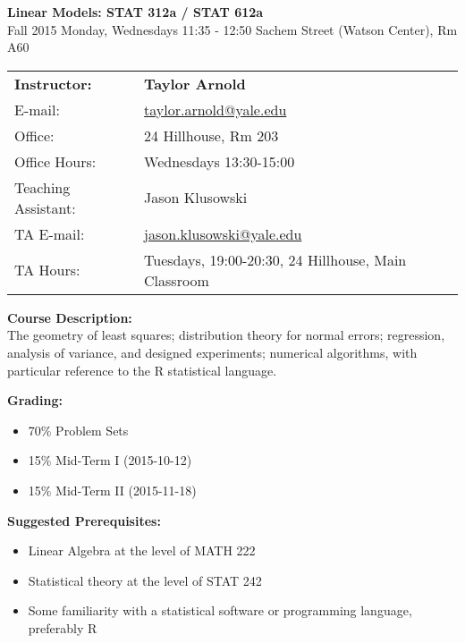 \documentclass[12pt]{article}
\begin{document}
\begin{center}
{\bf Linear Models: STAT 312a / STAT 612a} \\
Fall 2015 \quad Monday, Wednesdays 11:35 - 12:50  Sachem Street (Watson Center), Rm A60
\end{center}

\bigskip

\noindent
\begin{tabular}{ l l }
{\bf Instructor:} &  {\bf Taylor Arnold} \\
E-mail: & \href{mailto:taylor.arnold@yale.edu}{taylor.arnold@yale.edu} \\
Office: & 24 Hillhouse, Rm 203 \\
Office Hours: & Wednesdays 13:30-15:00 \\
Teaching Assistant: & Jason Klusowski \\
TA E-mail: & \href{mailto:jason.klusowski@yale.edu}{jason.klusowski@yale.edu} \\
TA Hours: & Tuesdays, 19:00-20:30, 24 Hillhouse, Main Classroom
\end{tabular}

\vspace{1cm}

{\bf Course Description:} \\
The geometry of least squares; distribution theory for normal errors; regression, analysis of variance, and designed experiments; numerical algorithms, with particular reference to the R statistical language.

\vspace{0.5cm}

{\bf Grading:}
\begin{itemize}\setlength\itemsep{0em}
\item 70\% Problem Sets
\item 15\% Mid-Term I (2015-10-12)
\item 15\% Mid-Term II (2015-11-18)
\end{itemize}

\vspace{0.5cm}

{\bf Suggested Prerequisites:}
\begin{itemize}\setlength\itemsep{0em}
\item Linear Algebra at the level of MATH 222
\item Statistical theory at the level of STAT 242
\item Some familiarity with a statistical software or programming language, preferably R
\end{itemize}
\end{document}
